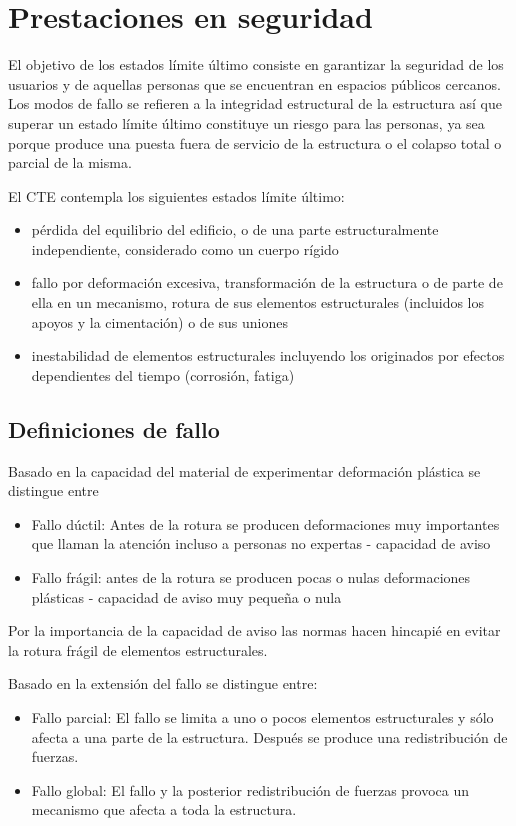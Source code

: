 \section{Prestaciones en seguridad}

El objetivo de los estados límite último consiste en garantizar la seguridad de los usuarios y de aquellas personas que se encuentran en espacios públicos cercanos. Los modos de fallo se refieren a la integridad estructural de la estructura así que superar un estado límite último constituye un riesgo para las personas, ya sea porque produce una puesta fuera de servicio de la estructura o el colapso total o parcial de la misma.

El CTE contempla los siguientes estados límite último:
\begin{itemize}
    \item pérdida del equilibrio del edificio, o de una parte estructuralmente independiente, considerado como un cuerpo rígido
    \item fallo por deformación excesiva, transformación de la estructura o de parte de ella en un mecanismo, rotura de sus elementos estructurales (incluidos los apoyos y la cimentación) o de sus uniones
    \item inestabilidad de elementos estructurales incluyendo los originados por efectos dependientes del tiempo (corrosión, fatiga)
\end{itemize}

\subsection{Definiciones de fallo}
Basado en la capacidad del material de experimentar deformación plástica se distingue entre 
\begin{itemize}
    \item Fallo dúctil: Antes de la rotura se producen deformaciones muy importantes que llaman la atención incluso a personas no expertas - capacidad de aviso
    \item Fallo frágil: antes de la rotura se producen pocas o nulas deformaciones plásticas - capacidad de aviso muy pequeña o nula
\end{itemize}
Por la importancia de la capacidad de aviso las normas hacen hincapié en evitar la rotura frágil de elementos estructurales.

Basado en la extensión del fallo se distingue entre:
\begin{itemize}
    \item Fallo parcial: El fallo se limita a uno o pocos elementos estructurales y sólo afecta a una parte de la estructura. Después se produce una redistribución de fuerzas.
    \item Fallo global: El fallo y la posterior redistribución de fuerzas provoca un mecanismo que afecta a toda la estructura.
\end{itemize}

